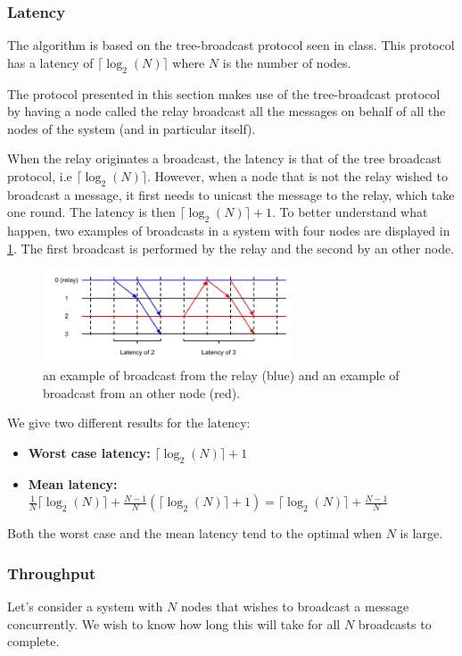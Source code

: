 \documentclass[a4paper]{article}
\begin{document}
\subsubsection{Latency}
The algorithm is based on the tree-broadcast protocol seen in class. This
protocol has a latency of $\lceil\log_2(N)\rceil$ where $N$ is the number of
nodes.

The protocol presented in this section makes use of the tree-broadcast
protocol by having a node called the relay broadcast all the messages on
behalf of all the nodes of the system (and in particular itself).

When the relay originates a broadcast, the latency is that of the tree
broadcast protocol, i.e $\lceil\log_2(N)\rceil$. However, when a node that is
not the relay wished to broadcast a message, it first needs to unicast the
message to the relay, which take one round. The latency is then
$\lceil\log_2(N)\rceil + 1$. To better understand what happen, two examples
of broadcasts in a system with four nodes are displayed in
\ref{figure:latency}. The first broadcast is performed by the relay and the
second by an other node.

\begin{figure}[h]
    \centering
    \includegraphics[width=280px]{Latency.png}
    \caption{an example of broadcast from the relay (blue) and an example of broadcast from an other node (red).}
    \label{figure:latency}
\end{figure}

We give two different results for the latency:
\begin{itemize}
    \item \textbf{Worst case latency:} $\lceil\log_2(N)\rceil + 1$
    \item \textbf{Mean latency:} $\frac{1}{N} \lceil\log_2(N)\rceil +
        \frac{N-1}{N} (\lceil\log_2(N)\rceil + 1)
        = \lceil\log_2(N)\rceil + \frac{N-1}{N}$
\end{itemize}

Both the worst case and the mean latency tend to the optimal when $N$ is
large.

\subsubsection{Throughput}
Let's consider a system with $N$ nodes that wishes to broadcast a message
concurrently. We wish to know how long this will take for all $N$ broadcasts
to complete.
\end{document}
